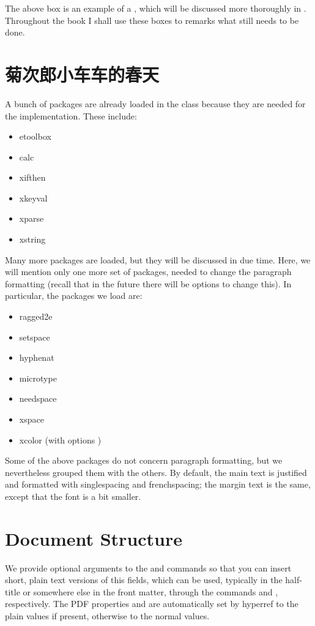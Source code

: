 The above box is an example of a , which will be
discussed more thoroughly in . Throughout the book I
shall use these boxes to remarks what still needs to be done.

\section{菊次郎小车车的春天}

A bunch of packages are already loaded in the class because they are
needed for the implementation. These include:

\begin{itemize}
	\item etoolbox
	\item calc
	\item xifthen
	\item xkeyval
	\item xparse
	\item xstring
\end{itemize}

Many more packages are loaded, but they will be discussed in due time.
Here, we will mention only one more set of packages, needed to change
the paragraph formatting (recall that in the future there will be
options to change this). In particular, the packages we load are:

\begin{itemize}
	\item ragged2e
	\item setspace
	\item hyphenat
	\item microtype
	\item needspace
	\item xspace
	\item xcolor (with options )
\end{itemize}

Some of the above packages do not concern paragraph formatting, but we
nevertheless grouped them with the others. By default, the main text is
justified and formatted with singlespacing and frenchspacing; the margin
text is the same, except that the font is a bit smaller.

\section{Document Structure}

We provide optional arguments to the  and
 commands so that you can insert short, plain text
versions of this fields, which can be used, typically in the half-title
or somewhere else in the front matter, through the commands
 and , respectively. The PDF
properties  and  are automatically
set by hyperref to the plain values if present, otherwise to the normal
values.

